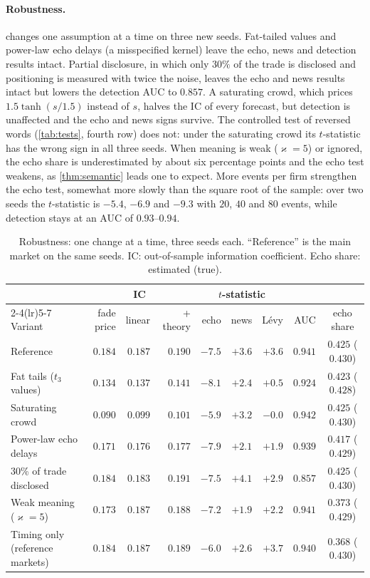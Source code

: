 \documentclass{article}
\theoremstyle{plain}
\theoremstyle{definition}
\theoremstyle{remark}
\begin{document}
\paragraph{Robustness.}  changes one assumption at a time on three new seeds. Fat-tailed values and power-law echo delays (a misspecified kernel) leave the echo, news and detection results intact. Partial disclosure, in which only $30\%$ of the trade is disclosed and positioning is measured with twice the noise, leaves the echo and news results intact but lowers the detection AUC to $0.857$. A saturating crowd, which prices $1.5\tanh(s/1.5)$ instead of $s$, halves the IC of every forecast, but detection is unaffected and the echo and news signs survive. The controlled test of reversed words (\cref{tab:tests}, fourth row) does not: under the saturating crowd its $t$-statistic has the wrong sign in all three seeds. When meaning is weak ($\varkappa=5$) or ignored, the echo share is underestimated by about six percentage points and the echo test weakens, as \cref{thm:semantic} leads one to expect. More events per firm strengthen the echo test, somewhat more slowly than the square root of the sample: over two seeds the $t$-statistic is $-5.4$, $-6.9$ and $-9.3$ with $20$, $40$ and $80$ events, while detection stays at an AUC of $0.93$--$0.94$.

\begin{table}[ht]
\centering
\caption{Robustness: one change at a time, three seeds each. ``Reference'' is the main market on the same seeds. IC: out-of-sample information coefficient. Echo share: estimated (true).}
\label{tab:robust}
\small
\setlength{\tabcolsep}{3.6pt}
\begin{tabular}{@{}lrrrrrrrc@{}}
\toprule
& \multicolumn{3}{c}{IC} & \multicolumn{3}{c}{$t$-statistic} & & \\
\cmidrule(lr){2-4}\cmidrule(lr){5-7}
Variant & fade price & linear & + theory & echo & news & L\'evy & AUC & echo share \\
\midrule
Reference & $0.184$ & $0.187$ & $0.190$ & $-7.5$ & $+3.6$ & $+3.6$ & $0.941$ & $0.425$ ($0.430$) \\
Fat tails ($t_3$ values) & $0.134$ & $0.137$ & $0.141$ & $-8.1$ & $+2.4$ & $+0.5$ & $0.924$ & $0.423$ ($0.428$) \\
Saturating crowd & $0.090$ & $0.099$ & $0.101$ & $-5.9$ & $+3.2$ & $-0.0$ & $0.942$ & $0.425$ ($0.430$) \\
Power-law echo delays & $0.171$ & $0.176$ & $0.177$ & $-7.9$ & $+2.1$ & $+1.9$ & $0.939$ & $0.417$ ($0.429$) \\
30\% of trade disclosed & $0.184$ & $0.183$ & $0.191$ & $-7.5$ & $+4.1$ & $+2.9$ & $0.857$ & $0.425$ ($0.430$) \\
Weak meaning ($\varkappa=5$) & $0.173$ & $0.187$ & $0.188$ & $-7.2$ & $+1.9$ & $+2.2$ & $0.941$ & $0.373$ ($0.429$) \\
Timing only (reference markets) & $0.184$ & $0.187$ & $0.189$ & $-6.0$ & $+2.6$ & $+3.7$ & $0.940$ & $0.368$ ($0.430$) \\
\bottomrule
\end{tabular}
\end{table}
\end{document}

